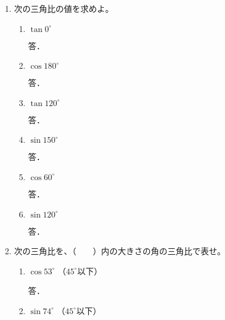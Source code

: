 \documentclass[b4paper,twocolumn]{jsarticle}
\begin{document}

\begin{enumerate}
\item 次の三角比の値を求めよ。

\begin{enumerate}
\item $\tan 0^\circ $
\vfill

\hfill 答．\underline{\hspace{50truemm}}

\item $\cos 180^\circ $
\vfill

\hfill 答．\underline{\hspace{50truemm}}

\item $\tan 120^\circ $
\vfill

\hfill 答．\underline{\hspace{50truemm}}

\item $\sin 150^\circ $
\vfill

\hfill 答．\underline{\hspace{50truemm}}

\item $\cos 60^\circ $
\vfill

\hfill 答．\underline{\hspace{50truemm}}

\item $\sin 120^\circ $
\vfill

\hfill 答．\underline{\hspace{50truemm}}

\end{enumerate}

\item 次の三角比を、（　　）内の大きさの角の三角比で表せ。

\begin{enumerate}
\item $\cos 53^\circ$ \hfill （$45^\circ$以下） \hspace{30truemm}
\vfill

\hfill 答．\underline{\hspace{50truemm}}

\item $\sin 74^\circ$ \hfill （$45^\circ$以下） \hspace{30truemm}
\vfill


\end{enumerate}
\end{enumerate}
\end{document}
